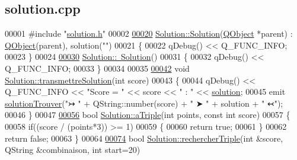 \hypertarget{solution_8cpp_source}{}\subsection{solution.\+cpp}

\begin{DoxyCode}
00001 \textcolor{preprocessor}{#include "\hyperlink{solution_8h}{solution.h}"}
00002 
\hyperlink{class_solution_a378d4a570c95a6d4c013996fef75c6f0}{00020} \hyperlink{class_solution_a378d4a570c95a6d4c013996fef75c6f0}{Solution::Solution}(\hyperlink{class_q_object}{QObject} *parent) : \hyperlink{class_q_object}{QObject}(parent), solution(\textcolor{stringliteral}{""})
00021 \{
00022    qDebug() << Q\_FUNC\_INFO;
00023 \}
00024 
\hyperlink{class_solution_a5d245f7409aacf6ace5e965b7879a580}{00030} \hyperlink{class_solution_a5d245f7409aacf6ace5e965b7879a580}{Solution::~Solution}()
00031 \{
00032    qDebug() << Q\_FUNC\_INFO;
00033 \}
00034 
00035 
\hyperlink{class_solution_a334ffddf70bd379a0af7c7e93750d6b5}{00042} \textcolor{keywordtype}{void} \hyperlink{class_solution_a334ffddf70bd379a0af7c7e93750d6b5}{Solution::transmettreSolution}(\textcolor{keywordtype}{int} score)
00043 \{
00044     qDebug() << Q\_FUNC\_INFO << \textcolor{stringliteral}{"Score = "} << score << \textcolor{stringliteral}{" : "} << \hyperlink{class_solution_a03b47dedfe8a8f8244f7e633cbaa30fb}{solution};
00045     emit \hyperlink{class_solution_a052b7ba921e7b211d14f2bbbc6b63832}{solutionTrouver}(\textcolor{stringliteral}{"↣  "} + QString::number(score) + \textcolor{stringliteral}{" ➤ "} + solution + \textcolor{stringliteral}{"  ↢"});
00046 \}
00047 
\hyperlink{class_solution_af8062e8e2997f8a7451e439ce23dd544}{00056} \textcolor{keywordtype}{bool} \hyperlink{class_solution_af8062e8e2997f8a7451e439ce23dd544}{Solution::aTriple}(\textcolor{keywordtype}{int} points, \textcolor{keyword}{const} \textcolor{keywordtype}{int} score)
00057 \{
00058     \textcolor{keywordflow}{if}((score / (points*3)) >= 1)
00059     \{
00060         \textcolor{keywordflow}{return} \textcolor{keyword}{true};
00061     \}
00062     \textcolor{keywordflow}{return} \textcolor{keyword}{false};
00063 \}
00064 
\hyperlink{class_solution_a7f3302e8292858a51795f08751d54ef9}{00074} \textcolor{keywordtype}{bool} \hyperlink{class_solution_a7f3302e8292858a51795f08751d54ef9}{Solution::rechercherTriple}(\textcolor{keywordtype}{int} &score, QString &combinaison, \textcolor{keywordtype}{int} start=20)

\end{DoxyCode}
